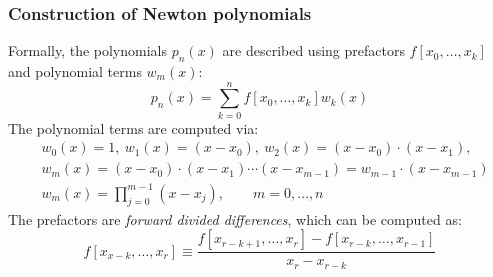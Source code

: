 \begin{frame}
  \frametitle{Construction of Newton polynomials}
  \footnotesize\selectfont
  Formally, the polynomials $p_n(x)$ are described using prefactors $f[x_0,\ldots,x_k]$ and polynomial terms $w_m(x)$:
  \[
    p_n(x) = \sum_{k=0}^n f[x_0,\ldots,x_k] w_k(x)
  \]
  \pause
  The polynomial terms are computed via:
  \begin{align*}
    &w_0(x) = 1, \ w_1(x)=(x-x_0), \ w_2(x)=(x-x_0)\cdot(x-x_1), \\
    &w_m(x)=(x-x_0)\cdot(x-x_1)\cdots(x-x_{m-1}) = w_{m-1}\cdot(x-x_{m-1})\\
    &w_m(x) = \prod_{j=0}^{m-1} (x-x_j), \qquad m=0,\ldots,n
  \end{align*}
  \pause
  The prefactors are \emph{forward divided differences}, which can be computed as:
    \[
      f[x_{x-k},\ldots,x_r] \equiv \frac{f[x_{r-k+1},\ldots,x_r]-f[x_{r-k},\ldots,x_{r-1}]}{x_r-x_{r-k}} 
    \]
\end{frame}

% 

